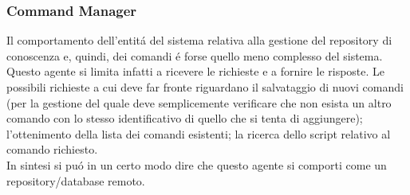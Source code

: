 \subsubsection{Command Manager}
Il comportamento dell'entit\'a del sistema relativa alla gestione del repository di conoscenza e, quindi, dei comandi \'e forse quello meno complesso del sistema. Questo agente si limita infatti a ricevere le richieste e a fornire le risposte. Le possibili richieste a cui deve far fronte riguardano il salvataggio di nuovi comandi (per la gestione del quale deve semplicemente verificare che non esista un altro comando con lo stesso identificativo di quello che si tenta di aggiungere); l'ottenimento della lista dei comandi esistenti; la ricerca dello script relativo al comando richiesto.\\
In sintesi si pu\'o in un certo modo dire che questo agente si comporti come un repository/database remoto.

